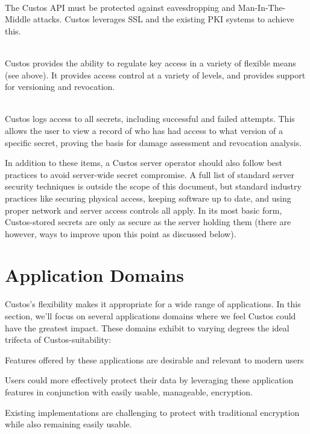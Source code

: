 \begin{packed_desc}
\item[Secure Communication Primitives] \hfill \\ The Custos API must
  be protected against eavesdropping and Man-In-The-Middle
  attacks. Custos leverages SSL and the existing PKI systems to
  achieve this.
\item[Access Control] \hfill \\ Custos provides the ability to
  regulate key access in a variety of flexible means (see above). It
  provides access control at a variety of levels, and provides support
  for versioning and revocation.
\item[Access Auditing] \hfill \\ Custos logs access to all secrets,
  including successful and failed attempts. This allows the user to
  view a record of who has had access to what version of a specific
  secret, proving the basis for damage assessment and revocation
  analysis.
\end{packed_desc}

In addition to these items, a Custos server operator should also
follow best practices to avoid server-wide secret compromise. A full
list of standard server security techniques is outside the scope of
this document, but standard industry practices like securing physical
access, keeping software up to date, and using proper network and
server access controls all apply. In its most basic form,
Custos-stored secrets are only as secure as the server holding them
(there are however, ways to improve upon this point as discussed
below).

\section{Application Domains}

Custos's flexibility makes it appropriate for a wide range of
applications. In this section, we'll focus on several applications
domains where we feel Custos could have the greatest impact. These
domains exhibit to varying degrees the ideal trifecta of
Custos-suitability:

\begin{packed_item}
\item Features offered by these applications are desirable and relevant
  to modern users
\item Users could more effectively protect their data by leveraging
  these application features in conjunction with easily usable,
  manageable, encryption.
\item Existing implementations are challenging to protect with traditional
  encryption while also remaining easily usable.
\end{packed_item}

